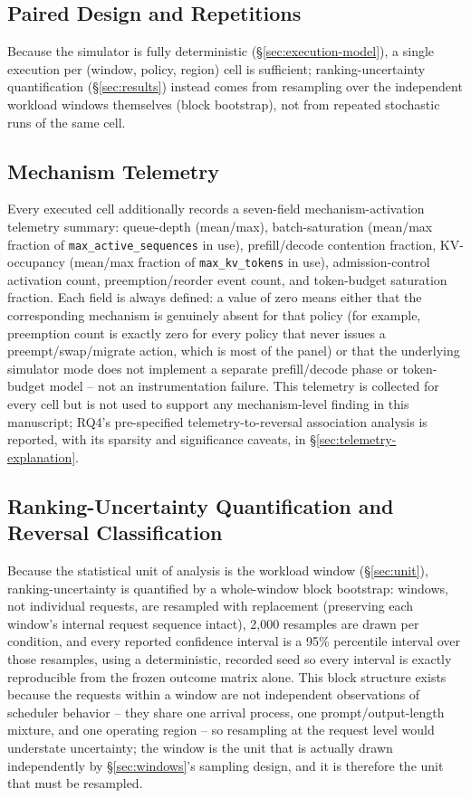 \documentclass[sn-basic,Numbered,pdflatex]{sn-jnl}
\begin{document}
\subsection{Paired Design and Repetitions}
\label{sec:paired}

Because the simulator is fully deterministic (\S\ref{sec:execution-model}),
a single execution per (window, policy, region) cell is sufficient;
ranking-uncertainty quantification (\S\ref{sec:results}) instead comes from
resampling over the independent workload windows themselves (block
bootstrap), not from repeated stochastic runs of the same cell.

\subsection{Mechanism Telemetry}
\label{sec:telemetry}

Every executed cell additionally records a seven-field mechanism-activation
telemetry summary: queue-depth (mean/max), batch-saturation (mean/max
fraction of \texttt{max\_active\_sequences} in use), prefill/decode
contention fraction, KV-occupancy (mean/max fraction of \texttt{max\_kv\_tokens}
in use), admission-control activation count, preemption/reorder event
count, and token-budget saturation fraction. Each field is always defined:
a value of zero means either that the corresponding mechanism is genuinely
absent for that policy (for example, preemption count is exactly zero for
every policy that never issues a preempt/swap/migrate action, which is most
of the panel) or that the underlying simulator mode does not implement a
separate prefill/decode phase or token-budget model -- not an
instrumentation failure. This telemetry is collected for every cell but is
not used to support any mechanism-level finding in this manuscript; RQ4's
pre-specified telemetry-to-reversal association analysis is reported, with
its sparsity and significance caveats, in \S\ref{sec:telemetry-explanation}.

\subsection{Ranking-Uncertainty Quantification and Reversal Classification}
\label{sec:uncertainty}

Because the statistical unit of analysis is the workload window
(\S\ref{sec:unit}), ranking-uncertainty is quantified by a whole-window
block bootstrap: windows, not individual requests, are resampled with
replacement (preserving each window's internal request sequence intact),
2{,}000 resamples are drawn per condition, and every reported confidence
interval is a 95\% percentile interval over those resamples, using a
deterministic, recorded seed so every interval is exactly reproducible from
the frozen outcome matrix alone. This block structure exists because the
requests within a window are not independent observations of scheduler
behavior -- they share one arrival process, one prompt/output-length
mixture, and one operating region -- so resampling at the request level
would understate uncertainty; the window is the unit that is actually
drawn independently by \S\ref{sec:windows}'s sampling design, and it is
therefore the unit that must be resampled.
\end{document}
